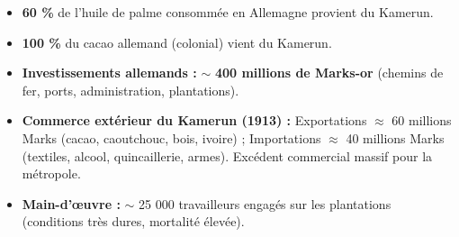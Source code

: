 \documentclass[11pt]{article}
\begin{document}
\begin{exemplebox}
\begin{itemize}
    \item \textbf{60 \%} de l'huile de palme consommée en Allemagne provient du Kamerun.
    \item \textbf{100 \%} du cacao allemand (colonial) vient du Kamerun.
    \item \textbf{Investissements allemands :} $\sim$ \textbf{400 millions de Marks-or} (chemins de fer, ports, administration, plantations).
    \item \textbf{Commerce extérieur du Kamerun (1913) :} Exportations $\approx$ 60 millions Marks (cacao, caoutchouc, bois, ivoire) ; Importations $\approx$ 40 millions Marks (textiles, alcool, quincaillerie, armes). Excédent commercial massif pour la métropole.
    \item \textbf{Main-d'œuvre :} $\sim$ 25 000 travailleurs engagés sur les plantations (conditions très dures, mortalité élevée).
\end{itemize}
\end{exemplebox}
\end{document}
